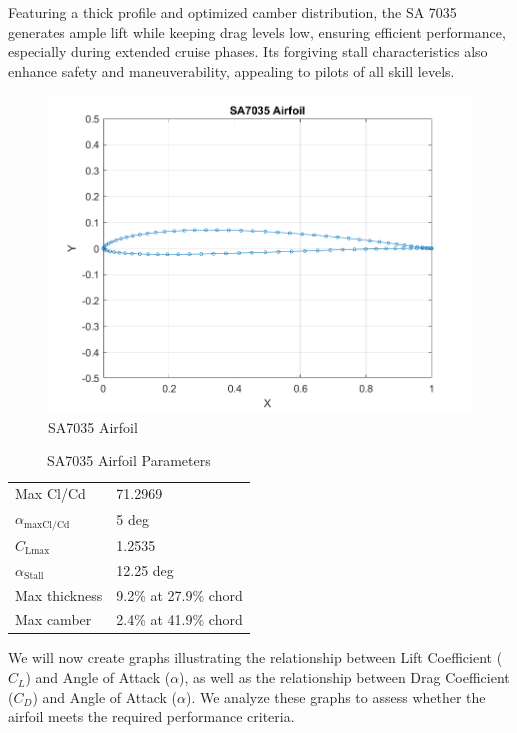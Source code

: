 \documentclass[12 pt]{article}
\begin{document}
Featuring a thick profile and optimized camber distribution, the SA 7035 generates ample lift while keeping drag levels low, ensuring efficient performance, especially during extended cruise phases. Its forgiving stall characteristics also enhance safety and maneuverability, appealing to pilots of all skill levels.
\begin{figure}[h]
    \centering
    \includegraphics[width = 0.85\linewidth]{Codes/Week 6/Airfoil.png}
    \caption{SA7035 Airfoil}
    \label{SA7035 Airfoil}
    \end{figure}
\begin{table}[h]
\centering
\caption{SA7035 Airfoil Parameters}
\begin{tabular}{ll}
\hline
Max Cl/Cd & 71.2969 \\
$\alpha_{\text{maxCl/Cd}}$ & 5 deg \\
$C_{\text{Lmax}}$ & 1.2535 \\
$\alpha_{\text{Stall}}$ & 12.25 deg \\
Max thickness & 9.2\% at 27.9\% chord \\
Max camber & 2.4\% at 41.9\% chord \\
\hline
\end{tabular}
\end{table}
\newpage
We will now create graphs illustrating the relationship between Lift Coefficient ($C_L$) and Angle of Attack ($\alpha$), as well as the relationship between Drag Coefficient ($C_D$) and Angle of Attack ($\alpha$). We analyze these graphs to assess whether the airfoil meets the required performance criteria.
\newpage
\end{document}
